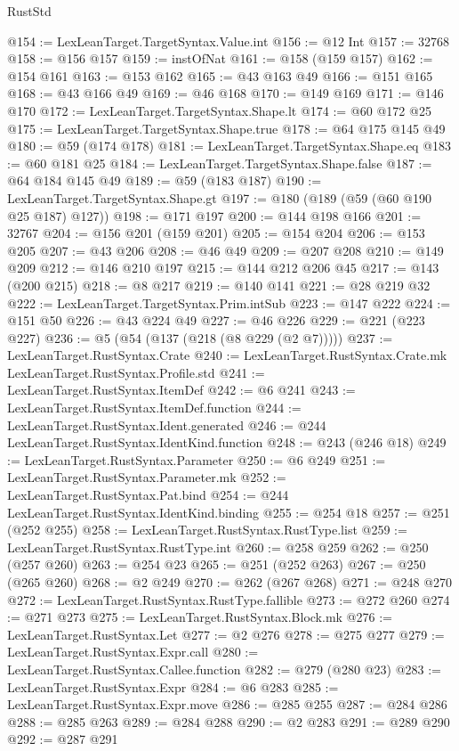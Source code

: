 \begin{lexlean}{RustStd}
\begin{coremodule}
{\begin{coremodule}
{{{{{{{{@154 := LexLeanTarget.TargetSyntax.Value.int
@156 := @12 Int
@157 := 32768
@158 := @156 @157
@159 := instOfNat
@161 := @158 (@159 @157)
@162 := @154 @161
@163 := @153 @162
@165 := @43 @163 @49
@166 := @151 @165
@168 := @43 @166 @49
@169 := @46 @168
@170 := @149 @169
@171 := @146 @170
@172 := LexLeanTarget.TargetSyntax.Shape.lt
@174 := @60 @172 @25
@175 := LexLeanTarget.TargetSyntax.Shape.true
@178 := @64 @175 @145 @49
@180 := @59 (@174 @178)
@181 := LexLeanTarget.TargetSyntax.Shape.eq
@183 := @60 @181 @25
@184 := LexLeanTarget.TargetSyntax.Shape.false
@187 := @64 @184 @145 @49
@189 := @59 (@183 @187)
@190 := LexLeanTarget.TargetSyntax.Shape.gt
@197 := @180 (@189 (@59 (@60 @190 @25 @187) @127))
@198 := @171 @197
@200 := @144 @198 @166
@201 := 32767
@204 := @156 @201 (@159 @201)
@205 := @154 @204
@206 := @153 @205
@207 := @43 @206
@208 := @46 @49
@209 := @207 @208
@210 := @149 @209
@212 := @146 @210 @197
@215 := @144 @212 @206 @45
@217 := @143 (@200 @215)
@218 := @8 @217
@219 := @140 @141
@221 := @28 @219 @32
@222 := LexLeanTarget.TargetSyntax.Prim.intSub
@223 := @147 @222
@224 := @151 @50
@226 := @43 @224 @49
@227 := @46 @226
@229 := @221 (@223 @227)
@236 := @5 (@54 (@137 (@218 (@8 @229 (@2 @7)))))
@237 := LexLeanTarget.RustSyntax.Crate
@240 := LexLeanTarget.RustSyntax.Crate.mk LexLeanTarget.RustSyntax.Profile.std
@241 := LexLeanTarget.RustSyntax.ItemDef
@242 := @6 @241
@243 := LexLeanTarget.RustSyntax.ItemDef.function
@244 := LexLeanTarget.RustSyntax.Ident.generated
@246 := @244 LexLeanTarget.RustSyntax.IdentKind.function
@248 := @243 (@246 @18)
@249 := LexLeanTarget.RustSyntax.Parameter
@250 := @6 @249
@251 := LexLeanTarget.RustSyntax.Parameter.mk
@252 := LexLeanTarget.RustSyntax.Pat.bind
@254 := @244 LexLeanTarget.RustSyntax.IdentKind.binding
@255 := @254 @18
@257 := @251 (@252 @255)
@258 := LexLeanTarget.RustSyntax.RustType.list
@259 := LexLeanTarget.RustSyntax.RustType.int
@260 := @258 @259
@262 := @250 (@257 @260)
@263 := @254 @23
@265 := @251 (@252 @263)
@267 := @250 (@265 @260)
@268 := @2 @249
@270 := @262 (@267 @268)
@271 := @248 @270
@272 := LexLeanTarget.RustSyntax.RustType.fallible
@273 := @272 @260
@274 := @271 @273
@275 := LexLeanTarget.RustSyntax.Block.mk
@276 := LexLeanTarget.RustSyntax.Let
@277 := @2 @276
@278 := @275 @277
@279 := LexLeanTarget.RustSyntax.Expr.call
@280 := LexLeanTarget.RustSyntax.Callee.function
@282 := @279 (@280 @23)
@283 := LexLeanTarget.RustSyntax.Expr
@284 := @6 @283
@285 := LexLeanTarget.RustSyntax.Expr.move
@286 := @285 @255
@287 := @284 @286
@288 := @285 @263
@289 := @284 @288
@290 := @2 @283
@291 := @289 @290
@292 := @287 @291
}}}}}}}}
\end{coremodule}}
\end{coremodule}
\end{lexlean}
